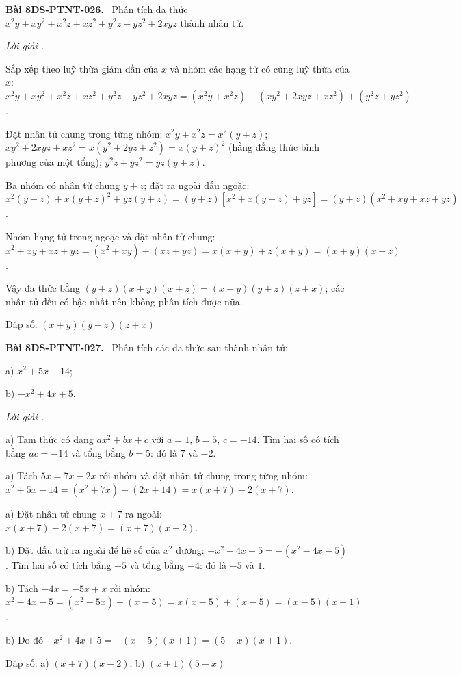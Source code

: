 \documentclass[12pt,a4paper]{article}
\newenvironment{problem}[1][]{\par\medskip\noindent\textbf{Bài #1.}\ }{\par}
\newenvironment{solution}[1][]{\par\noindent\textit{Lời giải #1.}\par}{\par}
\begin{document}
\begin{problem}[8DS-PTNT-026]
Phân tích đa thức $x^2y + xy^2 + x^2z + xz^2 + y^2z + yz^2 + 2xyz$ thành nhân tử.

\begin{solution}
Sắp xếp theo luỹ thừa giảm dần của $x$ và nhóm các hạng tử có cùng luỹ thừa của $x$: $x^2y + xy^2 + x^2z + xz^2 + y^2z + yz^2 + 2xyz = (x^2y + x^2z) + (xy^2 + 2xyz + xz^2) + (y^2z + yz^2)$.

Đặt nhân tử chung trong từng nhóm: $x^2y + x^2z = x^2(y + z)$; $xy^2 + 2xyz + xz^2 = x(y^2 + 2yz + z^2) = x(y + z)^2$ (hằng đẳng thức bình phương của một tổng); $y^2z + yz^2 = yz(y + z)$.

Ba nhóm có nhân tử chung $y + z$; đặt ra ngoài dấu ngoặc: $x^2(y + z) + x(y + z)^2 + yz(y + z) = (y + z)\left[x^2 + x(y + z) + yz\right] = (y + z)(x^2 + xy + xz + yz)$.

Nhóm hạng tử trong ngoặc và đặt nhân tử chung: $x^2 + xy + xz + yz = (x^2 + xy) + (xz + yz) = x(x + y) + z(x + y) = (x + y)(x + z)$.

Vậy đa thức bằng $(y + z)(x + y)(x + z) = (x + y)(y + z)(z + x)$; các nhân tử đều có bậc nhất nên không phân tích được nữa.

Đáp số: $\boxed{(x + y)(y + z)(z + x)}$
\end{solution}
\end{problem}

\begin{problem}[8DS-PTNT-027]
Phân tích các đa thức sau thành nhân tử:

a) $x^2 + 5x - 14$;

b) $-x^2 + 4x + 5$.

\begin{solution}
a) Tam thức có dạng $ax^2 + bx + c$ với $a = 1$, $b = 5$, $c = -14$. Tìm hai số có tích bằng $ac = -14$ và tổng bằng $b = 5$: đó là $7$ và $-2$.

a) Tách $5x = 7x - 2x$ rồi nhóm và đặt nhân tử chung trong từng nhóm: $x^2 + 5x - 14 = (x^2 + 7x) - (2x + 14) = x(x + 7) - 2(x + 7)$.

a) Đặt nhân tử chung $x + 7$ ra ngoài: $x(x + 7) - 2(x + 7) = (x + 7)(x - 2)$.

b) Đặt dấu trừ ra ngoài để hệ số của $x^2$ dương: $-x^2 + 4x + 5 = -(x^2 - 4x - 5)$. Tìm hai số có tích bằng $-5$ và tổng bằng $-4$: đó là $-5$ và $1$.

b) Tách $-4x = -5x + x$ rồi nhóm: $x^2 - 4x - 5 = (x^2 - 5x) + (x - 5) = x(x - 5) + (x - 5) = (x - 5)(x + 1)$.

b) Do đó $-x^2 + 4x + 5 = -(x - 5)(x + 1) = (5 - x)(x + 1)$.

Đáp số: a) $\boxed{(x + 7)(x - 2)}$; b) $\boxed{(x + 1)(5 - x)}$
\end{solution}
\end{problem}
\end{document}
